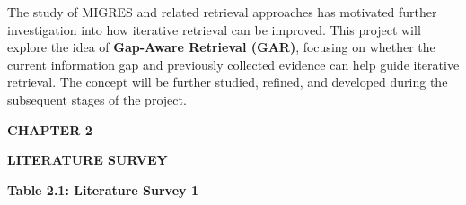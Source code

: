 \documentclass[12pt,a4paper]{report}
\newcommand{\chaptertitle}[2]{
    \begin{center}
        {\fontsize{18}{21}\selectfont\bfseries CHAPTER #1\par}
        \vspace{0.10in}
        {\fontsize{18}{21}\selectfont\bfseries #2\par}
    \end{center}
    \vspace{0.12in}
}
\begin{document}
The study of MIGRES and related retrieval approaches has motivated further investigation into how iterative retrieval can be improved. This project will explore the idea of \textbf{Gap-Aware Retrieval (GAR)}, focusing on whether the current information gap and previously collected evidence can help guide iterative retrieval. The concept will be further studied, refined, and developed during the subsequent stages of the project.

\clearpage




\chaptertitle{2}{LITERATURE SURVEY}

\small


\begin{center}
\textbf{Table 2.1: Literature Survey 1}
\end{center}
\end{document}
